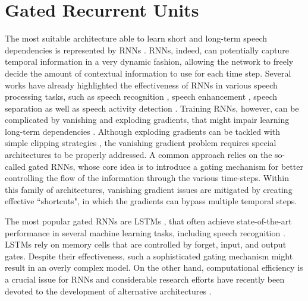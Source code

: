 \documentclass[journal]{IEEEtran}
\begin{document}
\section{Gated Recurrent Units} \label{sec:rev_gru}

The most suitable architecture able to learn short and long-term speech dependencies is represented by RNNs \cite{lideng}. RNNs, indeed, can potentially capture temporal information in a very dynamic fashion, allowing the network to freely decide the amount of contextual information to use for each time step. Several works have already highlighted the effectiveness of RNNs in various speech processing tasks, such as speech recognition \cite{graves,lstm_speech,baidu,joint6,chime4_paper}, speech enhancement \cite{dnn_se3}, speech separation \cite{sep_lstm,ndnn1} as well as speech activity detection \cite{lstm_vad}.
Training RNNs, however, can be complicated by vanishing and exploding gradients, that might impair learning long-term dependencies \cite{Bengio94}.
Although exploding gradients can be tackled with simple clipping strategies \cite{pascanau}, the vanishing gradient problem requires special architectures to be properly addressed. A common approach relies on the so-called gated RNNs, whose core idea is to introduce a gating mechanism for better controlling the flow of the information through the various time-steps. Within this family of architectures, vanishing gradient issues are mitigated by creating effective ``shortcuts", in which the gradients can  bypass multiple temporal steps.

The most popular gated RNNs are LSTMs \cite{lstm}, that often achieve state-of-the-art performance in several machine learning tasks, including speech recognition \cite{graves,lstm_speech,baidu,dnn_se3,joint6,chime4_paper}.
LSTMs rely on memory cells that are controlled by forget, input, and output gates.
Despite their effectiveness, such a sophisticated gating mechanism might result in an overly complex model. On the other hand, computational efficiency is a crucial issue for RNNs and considerable research efforts have recently been devoted to the development of alternative architectures \cite{lstm_odyssey,gru3,lstm_highway}.
\end{document}
